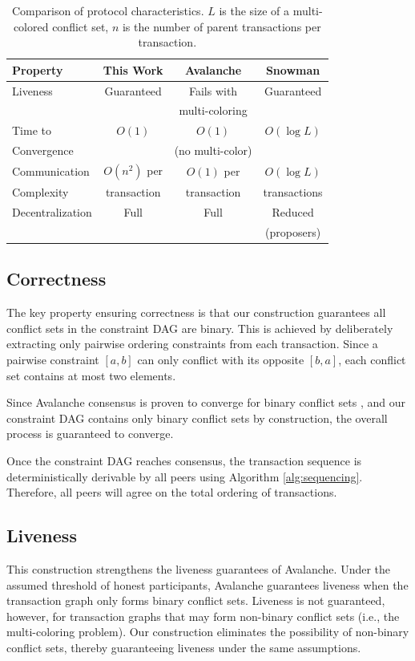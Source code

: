 \documentclass[12pt]{article}
\begin{document}
\begin{table}[h]
\centering
\begin{tabular}{|l|c|c|c|}
\hline
\textbf{Property} & \textbf{This Work} & \textbf{Avalanche \cite{rocket}} & \textbf{Snowman \cite{buchwald2024frosty}} \\
\hline
Liveness & Guaranteed & Fails with & Guaranteed \\
 & & multi-coloring & \\
\hline
Time to & $O(1)$ & $O(1)$ & $O(\log L)$ \\
Convergence & & (no multi-color) & \\
\hline
Communication & $O(n^2)$ per & $O(1)$ per & $O(\log L)$ \\
Complexity & transaction & transaction & transactions \\
\hline
Decentralization & Full & Full & Reduced \\
 & & & (proposers) \\
\hline
\end{tabular}
\caption{Comparison of protocol characteristics. $L$ is the size of a multi-colored conflict set, $n$ is the number of parent transactions per transaction.}
\label{tab:comparison}
\end{table}

\subsection{Correctness}
The key property ensuring correctness is that our construction guarantees all
conflict sets in the constraint DAG are binary. This is achieved by
deliberately extracting only pairwise ordering constraints from each
transaction. Since a pairwise constraint $[a,b]$ can only conflict with its
opposite $[b,a]$, each conflict set contains at most two elements.

Since Avalanche consensus is proven to converge for binary conflict sets
\cite{rocket}, and our constraint DAG contains only binary conflict sets by
construction, the overall process is guaranteed to converge.

Once the constraint DAG reaches consensus, the transaction sequence is
deterministically derivable by all peers using Algorithm \ref{alg:sequencing}.
Therefore, all peers will agree on the total ordering of transactions.

\subsection{Liveness}
This construction strengthens the liveness guarantees of Avalanche. Under the
assumed threshold of honest participants, Avalanche guarantees
liveness when the transaction graph only forms binary conflict sets. Liveness
is not guaranteed, however, for transaction graphs that may form non-binary
conflict sets (i.e., the multi-coloring problem). Our construction eliminates the
possibility of non-binary conflict sets, thereby guaranteeing liveness under
the same assumptions.
\end{document}
